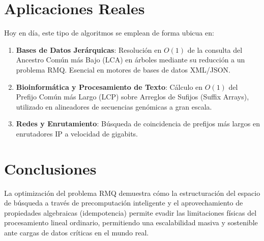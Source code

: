 \documentclass[twocolumn]{article}
\begin{document}
\section{Aplicaciones Reales}
Hoy en día, este tipo de algoritmos se emplean de forma ubicua en:
\begin{enumerate}
    \item \textbf{Bases de Datos Jerárquicas}: Resolución en $O(1)$ de la consulta del Ancestro Común más Bajo (LCA) en árboles mediante su reducción a un problema RMQ. Esencial en motores de bases de datos XML/JSON.
    \item \textbf{Bioinformática y Procesamiento de Texto}: Cálculo en $O(1)$ del Prefijo Común más Largo (LCP) sobre Arreglos de Sufijos (Suffix Arrays), utilizado en alineadores de secuencias genómicas a gran escala.
    \item \textbf{Redes y Enrutamiento}: Búsqueda de coincidencia de prefijos más largos en enrutadores IP a velocidad de gigabits.
\end{enumerate}

\section{Conclusiones}
La optimización del problema RMQ demuestra cómo la estructuración del espacio de búsqueda a través de precomputación inteligente y el aprovechamiento de propiedades algebraicas (idempotencia) permite evadir las limitaciones físicas del procesamiento lineal ordinario, permitiendo una escalabilidad masiva y sostenible ante cargas de datos críticas en el mundo real.
\end{document}

